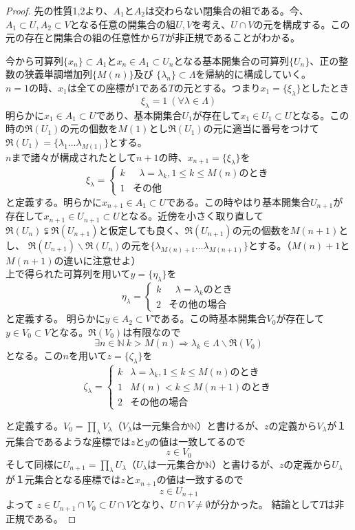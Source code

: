 \documentclass{jsarticle}
\begin{document}
\begin{proof}先の性質1,2より、$A_1$と$A_2$は交わらない閉集合の組である。今、
$A_1 \subset U, A_2\subset V$となる任意の開集合の組$U,V$を考え、$U\cap V$の元を構成する。この元の存在と開集合の組の任意性から$T$が非正規であることがわかる。

今から可算列$\{x_n\}\subset A_1$と$x_n\in A_1 \subset U_n$となる基本開集合の可算列$\{U_n\}$、正の整数の狭義単調増加列$\{M(n)\}$及び
$\{\lambda_{n}\}\subset \Lambda$を帰納的に構成していく。\\ 
$n=1$の時、$x_1$は全ての座標が$1$である$T$の元とする。つまり$x_1=\{\xi_{\lambda}\}$としたとき
\[
\xi_{\lambda}=1\ (\forall\lambda\in\Lambda)
\]明らかに$x_1\in A_1 \subset U$であり、基本開集合$U_1$が存在して$x_1 \in U_1 \subset U$となる。この時の$\mathfrak{R}(U_1)$の元の個数を$M(1)$とし$\mathfrak{R}(U_1)$の元に適当に番号をつけて$\mathfrak{R}(U_1)=\{\lambda_1 \dots \lambda_{M(1)}\}$とする。\\ 
$n$まで諸々が構成されたとして$n+1$の時、$x_{n+1}=\{\xi_{\lambda}\}$を
\[
\xi_{\lambda}=
\begin{cases}
k & \text{ $\lambda=\lambda_{k},1\le k\le M(n)$のとき} \\
1 & \text{その他}
\end{cases}
\]
と定義する。明らかに$x_{n+1}\in A_1\subset U$である。この時やはり基本開集合$U_{n+1}$が存在して$x_{n+1}\in U_{n+1}\subset U$となる。近傍を小さく取り直して
$\mathfrak{R}(U_{n})\subsetneqq \mathfrak{R}(U_{n+1})$と仮定しても良く、$\mathfrak{R}(U_{n+1})$の元の個数を$M(n+1)$とし、
$\mathfrak{R}(U_{n+1})\smallsetminus \mathfrak{R}(U_{n})$の元を$\{\lambda_{M(n)+1}\dots \lambda_{M(n+1)}\}$とする。（$M(n)+1$と$M(n+1)$の違いに注意せよ）\\ 
上で得られた可算列を用いて$y=\{\eta_{\lambda}\}$を
\[
\eta_{\lambda}=
\begin{cases}
k & \text{ $\lambda=\lambda_{k}$のとき} \\
2 & \text{その他の場合}
\end{cases}
\]
と定義する。
明らかに$y\in A_2\subset V$である。この時基本開集合$V_0$が存在して
$y\in V_0\subset V$となる。$\mathfrak{R}(V_0)$は有限なので
\[\exists n\in\mathbb{N}\ k>M(n)\Rightarrow \lambda_{k}\in \Lambda \smallsetminus \mathfrak{R}(V_0)\]
となる。この$n$を用いて$z=\{\zeta_{\lambda}\}$を
\[
\zeta_{\lambda}=
\begin{cases}
k & \text{$\lambda=\lambda_{k},1\le k\le M(n)$のとき} \\
1 & \text{$M(n)<k\le M(n+1)$のとき} \\
2 & \text{その他の場合}
\end{cases}
\]

と定義する。$V_0=\prod_{\lambda}V_{\lambda}$（$V_{\lambda}$は一元集合か$\mathbb{N}$）と書けるが、$z$の定義から$V_{\lambda}$が１元集合であるような座標では$z$と$y$の値は一致してるので
\[
z\in V_0
\]
そして同様に$U_{n+1}=\prod_{\lambda}U_{\lambda}$（$U_{\lambda}$は一元集合か$\mathbb{N}$）と書けるが、$z$の定義から$U_{\lambda}$が１元集合となる座標では$z$と$x_{n+1}$の値は一致するので
\[
z\in U_{n+1}
\]
よって
$z\in U_{n+1}\cap V_0\subset U\cap V$となり、$U\cap V\neq \emptyset$が分かった。
結論として$T$は非正規である。
\end{proof}
\end{document}
